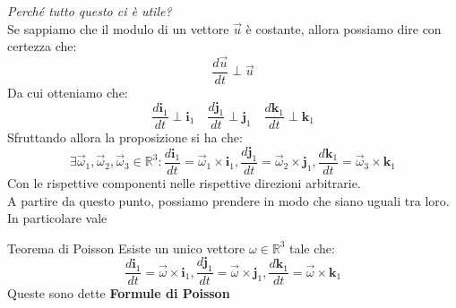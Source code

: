 \documentclass[11pt,a4paper,twoside]{article}
\theoremstyle{definition}
\begin{document}
\textit{Perché tutto questo ci è utile?}\\
Se sappiamo che il modulo di un vettore $\vec u$ è costante, allora possiamo dire con certezza che:
\[ \frac{d \vec u}{dt} \perp \vec u \]
Da cui otteniamo che:
\[ \frac{d \mathbf i_1}{dt} \perp \mathbf i_1 \quad \frac{d \mathbf j_1}{dt} \perp \mathbf j_1 \quad \frac{d \mathbf k_1}{dt} \perp \mathbf k_1 \]
Sfruttando allora la proposizione si ha che:
\[\exists \vec\omega_1, \vec\omega_2, \vec\omega_3 \in \mathbb R^3: \frac{d \mathbf i_1}{dt} = \vec \omega_1 \times \mathbf i_1,  \frac{d \mathbf j_1}{dt} = \vec \omega_2 \times \mathbf j_1, \frac{d \mathbf k_1}{dt} = \vec \omega_3 \times \mathbf k_1 \]
Con le rispettive componenti nelle rispettive direzioni arbitrarie.\\
A partire da questo punto, possiamo prendere in modo che siano uguali tra loro. In particolare vale

\begin{thm}{Teorema di Poisson}{}
	Esiste un unico vettore $\omega \in \mathbb R^3$ tale che:
	\[ \frac{d \mathbf i_1}{dt} = \vec \omega \times \mathbf i_1,  \frac{d \mathbf j_1}{dt} = \vec \omega \times \mathbf j_1, \frac{d \mathbf k_1}{dt} = \vec \omega \times \mathbf k_1 \]
	Queste sono dette \textbf{Formule di Poisson}
\end{thm}
\end{document}
